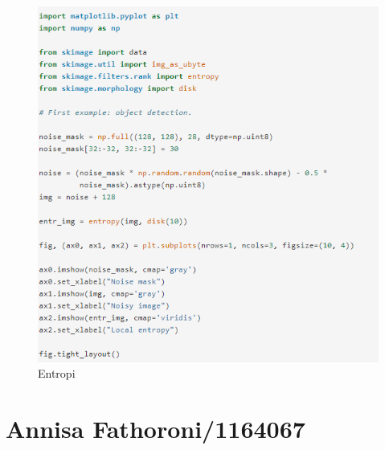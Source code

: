 \begin{enumerate}
\begin{figure}[ht]
\includegraphics[scale=0.5]{figures/wiendh8.png}
\caption{Entropi}
\label{contoh}
\end{figure}
\end{enumerate}

\section{Annisa Fathoroni/1164067}
